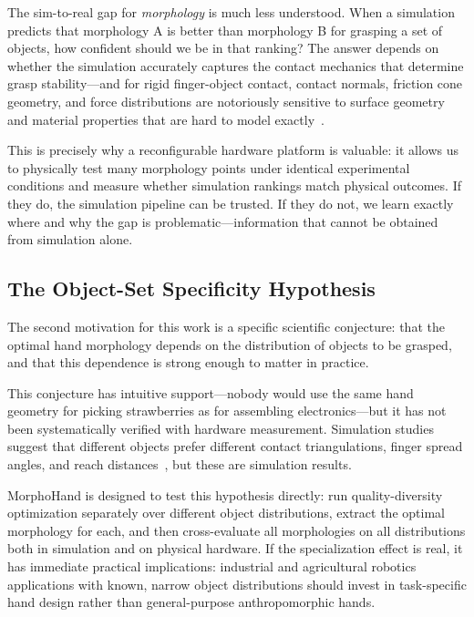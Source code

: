 \documentclass[journal]{IEEEtran}
\begin{document}
The sim-to-real gap for \emph{morphology} is much less understood.
When a simulation predicts that morphology A is better than morphology B for grasping
a set of objects, how confident should we be in that ranking?
The answer depends on whether the simulation accurately captures the contact mechanics
that determine grasp stability---and for rigid finger-object contact, contact normals,
friction cone geometry, and force distributions are notoriously sensitive to surface
geometry and material properties that are hard to model exactly~\cite{gilday2025parametric}.

This is precisely why a reconfigurable hardware platform is valuable: it allows us to
physically test many morphology points under identical experimental conditions and measure
whether simulation rankings match physical outcomes.
If they do, the simulation pipeline can be trusted.
If they do not, we learn exactly where and why the gap is problematic---information
that cannot be obtained from simulation alone.

\subsection{The Object-Set Specificity Hypothesis}

The second motivation for this work is a specific scientific conjecture: that the optimal
hand morphology depends on the distribution of objects to be grasped, and that this
dependence is strong enough to matter in practice.

This conjecture has intuitive support---nobody would use the same hand geometry for picking
strawberries as for assembling electronics---but it has not been systematically verified
with hardware measurement.
Simulation studies suggest that different objects prefer different contact triangulations,
finger spread angles, and reach distances~\cite{hazard2020automated, pollard2021complex},
but these are simulation results.

MorphoHand is designed to test this hypothesis directly: run quality-diversity optimization
separately over different object distributions, extract the optimal morphology for each,
and then cross-evaluate all morphologies on all distributions both in simulation and on
physical hardware.
If the specialization effect is real, it has immediate practical implications: industrial
and agricultural robotics applications with known, narrow object distributions should
invest in task-specific hand design rather than general-purpose anthropomorphic hands.
\end{document}
